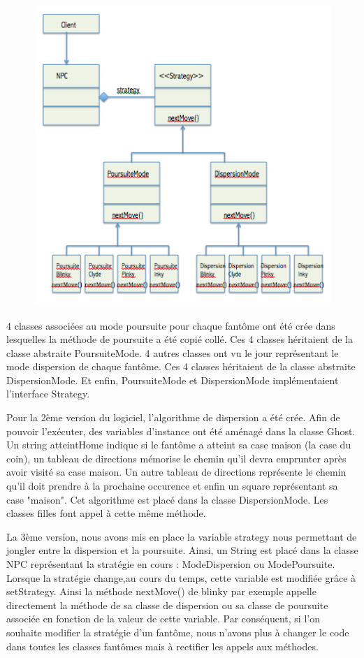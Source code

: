 \documentclass[a4paper,12pt]{report} %
\begin{document}
\begin{figure}[!h] %
		\centering
		\includegraphics[scale=0.9]{ressources/StrategyDP.png}
\end{figure}


4 classes associées au mode poursuite pour chaque fantôme ont été crée dans lesquelles la méthode de poursuite a été copié collé. Ces 4 classes héritaient de la classe abstraite PoursuiteMode.
4 autres classes ont vu le jour représentant le mode dispersion de chaque fantôme.
Ces 4 classes héritaient de la classe abstraite DispersionMode.
Et enfin, PoursuiteMode et DispersionMode implémentaient l'interface Strategy.

Pour la 2ème version du logiciel, l'algorithme de dispersion a été crée.
Afin de pouvoir l'exécuter, des variables d'instance ont été aménagé dans la classe Ghost. Un string atteintHome indique si le fantôme a atteint sa case maison (la case du coin), un tableau de directions mémorise le chemin qu'il devra emprunter après avoir visité sa case maison. Un autre tableau de directions représente le chemin qu'il doit prendre à la prochaine occurence et enfin un square représentant sa case "maison".
Cet algorithme est placé dans la classe DispersionMode. Les classes filles font appel à cette même méthode.

La 3ème version, nous avons mis en place la variable strategy nous permettant de jongler entre la dispersion et la poursuite.
Ainsi, un String est placé dans la classe NPC représentant la stratégie en cours : ModeDispersion ou ModePoursuite. Lorsque la stratégie change,au cours du temps, cette variable est modifiée grâce à setStrategy.
Ainsi la méthode nextMove() de blinky par exemple appelle directement la méthode de sa classe de dispersion ou sa classe de poursuite associée en fonction de la valeur de cette variable.
Par conséquent, si l'on souhaite modifier la stratégie d'un fantôme, nous n'avons plus à changer le code dans toutes les classes fantômes mais à rectifier les appels aux méthodes.
\end{document}
